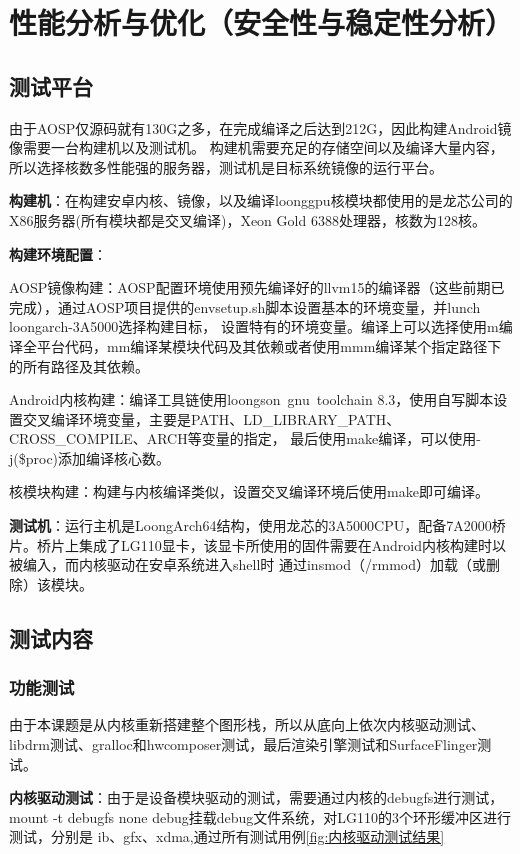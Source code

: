 
\chapter{性能分析与优化（安全性与稳定性分析）}

\section{测试平台}
由于AOSP仅源码就有130G之多，在完成编译之后达到212G，因此构建Android镜像需要一台构建机以及测试机。
构建机需要充足的存储空间以及编译大量内容，所以选择核数多性能强的服务器，测试机是目标系统镜像的运行平台。

\textbf{构建机}：在构建安卓内核、镜像，以及编译loonggpu核模块都使用的是龙芯公司的X86服务器(所有模块都是交叉编译)，Xeon Gold 6388处理器，核数为128核。

\textbf{构建环境配置}：

    AOSP镜像构建：AOSP配置环境使用预先编译好的llvm15的编译器（这些前期已完成），通过AOSP项目提供的envsetup.sh脚本设置基本的环境变量，并lunch loongarch-3A5000选择构建目标，
        设置特有的环境变量。编译上可以选择使用m编译全平台代码，mm编译某模块代码及其依赖或者使用mmm编译某个指定路径下的所有路径及其依赖。

    Android内核构建：编译工具链使用loongson\ gnu\ toolchain 8.3，使用自写脚本设置交叉编译环境变量，主要是PATH、LD\_LIBRARY\_PATH、CROSS\_COMPILE、ARCH等变量的指定，
        最后使用make编译，可以使用-j(\$proc)添加编译核心数。

    核模块构建：构建与内核编译类似，设置交叉编译环境后使用make即可编译。

\textbf{测试机}：运行主机是LoongArch64结构，使用龙芯的3A5000CPU，配备7A2000桥片。桥片上集成了LG110显卡，该显卡所使用的固件需要在Android内核构建时以被编入，而内核驱动在安卓系统进入shell时
    通过insmod（/rmmod）加载（或删除）该模块。

\section{测试内容}

\subsection{功能测试}
由于本课题是从内核重新搭建整个图形栈，所以从底向上依次内核驱动测试、libdrm测试、gralloc和hwcomposer测试，最后渲染引擎测试和SurfaceFlinger测试。

\textbf{内核驱动测试}：由于是设备模块驱动的测试，需要通过内核的debugfs进行测试，mount -t debugfs none debug挂载debug文件系统，对LG110的3个环形缓冲区进行测试，分别是
ib、gfx、xdma,通过所有测试用例\ref{fig:内核驱动测试结果}

